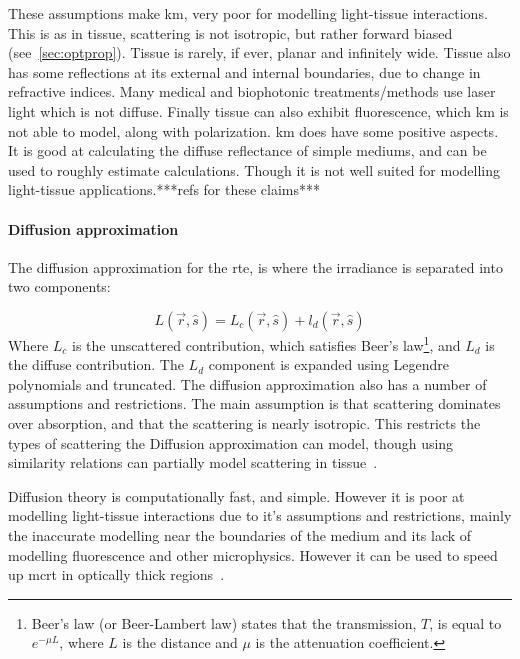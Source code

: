 These assumptions make \gls{km}, very poor for modelling light-tissue interactions. This is as in tissue, scattering is not isotropic, but rather forward biased (see~\cref{sec:optprop}). Tissue is rarely, if ever, planar and infinitely wide. Tissue also has some reflections at its external and internal boundaries, due to change in refractive indices. Many medical and biophotonic treatments/methods use laser light which is not diffuse. Finally tissue can also exhibit fluorescence, which \gls{km} is not able to model, along with polarization. 
\Gls{km} does have some positive aspects. It is good at calculating the diffuse reflectance of simple mediums, and can be used to roughly estimate calculations. Though it is not well suited for modelling light-tissue applications.***refs for these claims***

\paragraph{Diffusion approximation}
The diffusion approximation for the \gls{rte}, is where the irradiance is separated into two components:

\begin{equation}
	L(\vec{r},\hat{s}) = L_c(\vec{r},\hat{s}) +l_d(\vec{r},\hat{s})
\end{equation}
Where $L_c$ is the unscattered contribution, which satisfies Beer's law\footnote{Beer's law (or Beer-Lambert law) states that the transmission, $T$, is equal to $e^{-\mu L}$, where $L$ is the distance and $\mu$ is the attenuation coefficient.}, and $L_d$ is the diffuse contribution. The $L_d$ component is expanded using Legendre polynomials and truncated. 
The diffusion approximation also has a number of assumptions and restrictions. The main assumption is that scattering dominates over absorption, and that the scattering is nearly isotropic. This restricts the types of scattering the Diffusion approximation can model, though using similarity relations can partially model scattering in tissue~\cite{graaff1993similarity,yoon1989accuracies}.

Diffusion theory is computationally fast, and simple. However it is poor at modelling light-tissue interactions due to it's assumptions and restrictions, mainly the inaccurate modelling near the boundaries of the medium and its lack of modelling fluorescence and other microphysics. However it can be used to speed up \gls{mcrt} in optically thick regions~\cite{robitaille2010modified,min2009radiative}.

